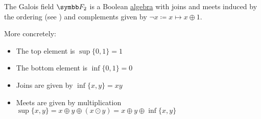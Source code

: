 \begin{theorem}\label{thm:f2_is_boolean_algebra}
  The Galois field \( \BF_2 \) is a Boolean \hyperref[def:boolean_algebra]{algebra} with joins and meets induced by the ordering (see ) and complements given by \( \neg x \coloneqq x \mapsto x \oplus 1 \).

  More concretely:
  \begin{itemize}
    \item The top element is \( \sup \{ 0, 1 \} = 1 \)
    \item The bottom element is \( \inf \{ 0, 1 \} = 0 \)
    \item Joins are given by \( \inf \{ x, y \} = xy \)
    \item Meets are given by multiplication \( \sup \{ x, y \} = x \oplus y \oplus (x \odot y) = x \oplus y \oplus \inf \{ x, y \} \)
  \end{itemize}
\end{theorem}
